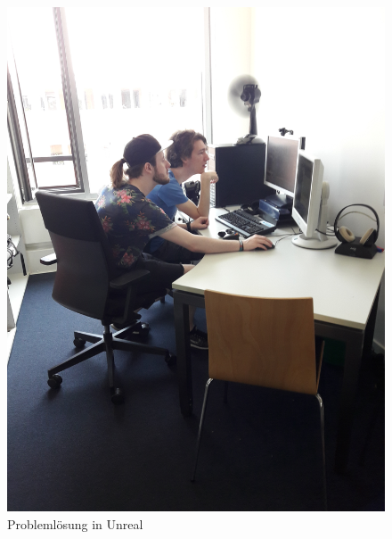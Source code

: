 \documentclass{Bericht}
\begin{document}
		

		\begin{figure}[!htbp] %
			\centering
			\includegraphics[trim = 200mm 0mm 600mm 0mm, clip, height=\linewidth, width=\textheight, keepaspectratio, angle=270]{../Bilder/20170619_102101.jpg} %
			\caption{Problemlösung in Unreal}
			\label{img:porblemloesung}
		\end{figure}
		
\end{document}
